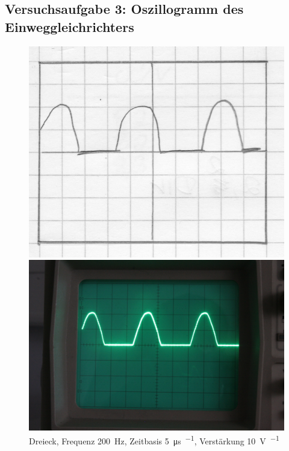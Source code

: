 \FloatBarrier
\subsection{Versuchsaufgabe 3: Oszillogramm des Einweggleichrichters}

\begin{figure}[htbp]
	\centering
	\begin{minipage}{.45\linewidth}
	\includegraphics[width=\linewidth]{Oszi_Hand/790.jpg}
	\end{minipage}
	\hfill
	\begin{minipage}{.45\linewidth}
	\includegraphics[width=\linewidth]{Oszi_Foto/790.jpg}
	\end{minipage}
	\caption{%
		Dreieck, Frequenz \SI{200}{\hertz},
		Zeitbasis \SI{5}{\micro\second\per\division},
		Verstärkung \SI{10}{\volt\per\division}
	}
	\label{fig:790}
\end{figure}

